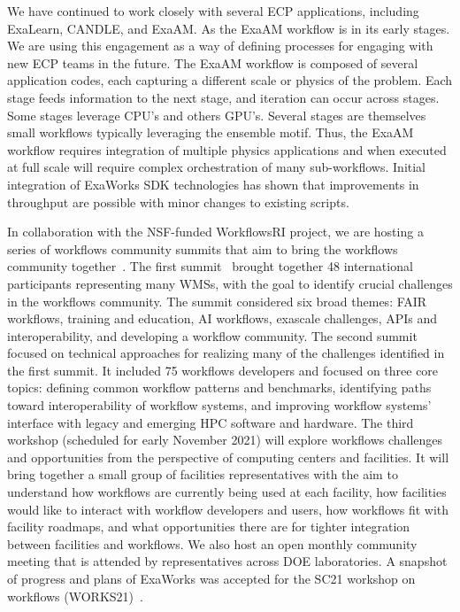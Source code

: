 We have continued to work closely with several ECP applications, including 
ExaLearn, CANDLE, and ExaAM.
As the ExaAM workflow is in its early stages. We are using this engagement
as a way of defining processes for engaging with new ECP teams in the future.  
The ExaAM workflow is composed of several application codes, each capturing a
different scale or physics of the problem.  Each stage feeds
information to the next stage, and iteration can occur across stages.  Some
stages leverage CPU's and others GPU's. Several stages are themselves small
workflows typically leveraging the ensemble motif. Thus, the ExaAM
workflow requires integration of multiple physics applications and when
executed at full scale will require complex orchestration of many
sub-workflows.  
Initial integration of ExaWorks SDK technologies has shown that
improvements in throughput are possible with minor changes to existing scripts.

In collaboration with the NSF-funded WorkflowsRI project, we are hosting a
series of workflows community summits that aim to bring the workflows
community together~\cite{dasilva2021community}. The first
summit~\cite{summit-1} brought together 48 international participants
representing many WMSs, with the goal to identify crucial challenges in the
workflows community. The summit considered six broad themes: FAIR workflows,
training and education, AI workflows, exascale challenges, APIs and
interoperability, and developing a workflow community. The second
summit~\cite{summit-2} focused on technical approaches for realizing many of
the challenges identified in the first summit. It included 75 workflows
developers %
and focused on three core topics: defining common workflow patterns and
benchmarks, identifying paths toward interoperability of workflow systems, and
improving workflow systems' interface with legacy and emerging HPC software
and hardware. The third workshop (scheduled for early November 2021) will
explore workflows challenges and opportunities from the perspective of
computing centers and facilities.  It will bring together a small group of
facilities representatives with the aim to understand how workflows are
currently being used at each facility, how facilities would like to interact
with workflow developers and users, how workflows fit with facility roadmaps,
and what opportunities there are for tighter integration between facilities
and workflows. We also host an open monthly community meeting that is attended
by representatives across DOE laboratories. A snapshot of progress and plans
of ExaWorks was accepted for the SC21 workshop on workflows
(WORKS21)~\cite{alsaadi2021exaworks}.


